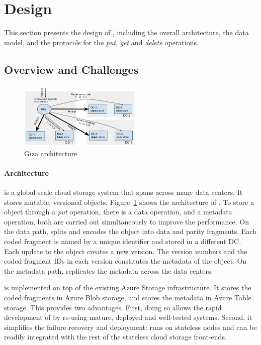 \section{Design}
\label{sec:design}

This section presents the design of {\name}, including the overall architecture,
the data model, and the protocols for the {\em put}, {\em get} and {\em delete} operations.

\subsection{Overview and Challenges}

\begin{figure}[tp]
\centering
\includegraphics[width=0.52\textwidth]{fig/Giza}
\caption{Giza architecture\label{fig:arch}}
\end{figure}

\paragraph{Architecture}
{\name} is a global-scale cloud storage system that spans across many data
centers. It stores mutable, versioned objects. Figure~\ref{fig:arch} shows the
architecture of \name. To store a \name object through a {\em put} operation,
there is a data operation, and a metadata operation, both are carried out
simultaneously to improve the performance. On the data path, \name splits and
encodes the object into data and parity fragments.
Each coded fragment is named by a unique identifier and stored in a different DC.
Each update to the object creates a new version. The version
numbers and the coded fragment IDs in each version constitutes the
metadata of the object. On the metadata path, \name replicates the metadata
across the data centers.

\name is implemented on top of the existing Azure Storage infrastructure.
It stores the coded fragments in Azure Blob storage, 
and stores the metadata in Azure Table storage.
This provides two advantages. First, doing so allows the rapid development of \name
by re-using mature, deployed and well-tested systems. Second, it simplifies the
failure recovery and deployment: \name runs on stateless nodes and can be readily
integrated with the rest of the stateless cloud storage front-ends.

